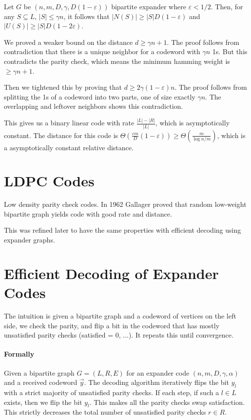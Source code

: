 \documentclass{idc_msc}
\begin{document}
Let \(G\) be \((n,m,D,\gamma,D(1-\varepsilon))\) bipartite expander where \(\varepsilon < 1/2\).
Then, for any \(S \subseteq L\), \(|S| \le \gamma n\), it follows that \(|N(S)| \ge |S|D(1-\varepsilon)\) and \(|U(S)| \ge |S|D(1-2\varepsilon)\).

We proved a weaker bound on the distance \(d \ge \gamma n + 1\).
The proof follows from contradiction that there is a unique neighbor for a codeword with \(\gamma n\) 1s.
But this contradicts the parity check, which means the minimum hamming weight is \(\ge \gamma n + 1\).

Then we tightened this by proving that \(d \ge 2\gamma (1-\varepsilon) n\).
The proof follows from splitting the 1s of a codeword into two parts, one of size exactly \(\gamma n\).
The overlapping and leftover neighbors shows this contradiction.

This gives us a binary linear code with rate \(\frac{|L| - |R|}{|L|}\), which is asymptotically constant.
The distance for this code is \(\Theta(\frac{\varepsilon m}{D}(1-\varepsilon)) \ge \Theta(\frac{m}{\log n/m})\), which is a asymptotically constant relative distance.

\section{LDPC Codes}

Low density parity check codes.
In 1962 Gallager proved\cite{gallager1962low} that random low-weight bipartite graph yields code with good rate and distance.

This was refined later to have the same properties with efficient decoding using expander graphs\cite{sipser1996expander}.


\clearpage
\section{Efficient Decoding of Expander Codes}

The intuition is given a bipartite graph and a codeword of vertices on the left side, we check the parity, and flip a bit in the codeword that has mostly unsatisfied parity checks (satisfied = 0, ...). It repeats this until convergence.

\paragraph{Formally}

Given a bipartite graph \(G=(L,R,E)\) for an expander code \((n,m,D,\gamma,\alpha)\) and a received codeword \(\vec{y}\).
The decoding algorithm iteratively flips the bit \(y_l\) with a strict majority of unsatisfied parity checks.
If each step, if such a \(l \in L\) exists, then we flip the bit \(y_l\).
This makes all the parity checks swap satisfaction.
This strictly decreases the total number of unsatisfied parity checks \(r \in R\).
\end{document}
